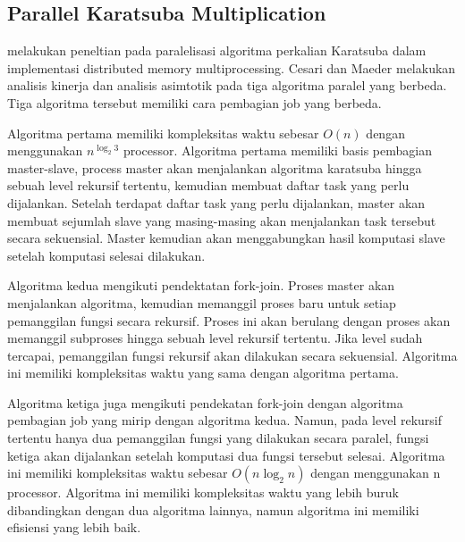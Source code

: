 \subsection{Parallel Karatsuba Multiplication} \label{sec:parallel_karatsuba}
\citep{parallel_karatsuba_analysis} melakukan peneltian pada paralelisasi algoritma perkalian Karatsuba dalam implementasi distributed memory multiprocessing. Cesari dan Maeder melakukan analisis  kinerja dan analisis asimtotik pada tiga algoritma paralel yang berbeda. Tiga algoritma tersebut memiliki cara pembagian job yang berbeda.

Algoritma pertama memiliki kompleksitas waktu sebesar $O(n)$ dengan menggunakan $n^{\log_2 3}$ processor. Algoritma pertama memiliki basis pembagian master-slave, process master akan menjalankan algoritma karatsuba hingga sebuah level rekursif tertentu, kemudian membuat daftar task yang perlu dijalankan. Setelah terdapat daftar task yang perlu dijalankan, master akan membuat sejumlah slave yang masing-masing akan menjalankan task tersebut secara sekuensial. Master kemudian akan menggabungkan hasil komputasi slave setelah komputasi selesai dilakukan.

Algoritma kedua mengikuti pendektatan fork-join. Proses master akan menjalankan algoritma, kemudian memanggil proses baru untuk setiap pemanggilan fungsi secara rekursif. Proses ini akan berulang dengan proses akan memanggil subproses hingga sebuah level rekursif tertentu. Jika level sudah tercapai, pemanggilan fungsi rekursif akan dilakukan secara sekuensial. Algoritma ini memiliki kompleksitas waktu yang sama dengan algoritma pertama.

Algoritma ketiga juga mengikuti pendekatan fork-join dengan algoritma pembagian job yang mirip dengan algoritma kedua. Namun, pada level rekursif tertentu hanya dua pemanggilan fungsi yang dilakukan secara paralel, fungsi ketiga akan dijalankan setelah komputasi dua fungsi tersebut selesai. Algoritma ini memiliki kompleksitas waktu sebesar $O(n\log_2n)$ dengan menggunakan n processor. Algoritma ini memiliki kompleksitas waktu yang lebih buruk dibandingkan dengan dua algoritma lainnya, namun algoritma ini memiliki efisiensi yang lebih baik.





